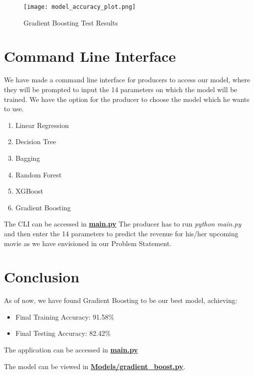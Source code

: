 \documentclass[conference]{IEEEtran}
\begin{document}
    \begin{figure}[h]
        \centering
        \texttt{[image: model\_accuracy\_plot.png]}
        \caption{Gradient Boosting Test Results}
        \label{fig:gradient_boosting_test}
    \end{figure}

\section{Command Line Interface}
    We have made a command line interface for producers to access our model, where they will be prompted to input the 14 parameters on which the model will be trained.
    We have the option for the producer to choose the model which he wants to use.
    \begin{enumerate}
        \item Linear Regression
        \item Decision Tree
        \item Bagging
        \item Random Forest
        \item XGBoost
        \item Gradient Boosting
    \end{enumerate}

    The CLI can be accessed in \href{https://github.com/Vikranth3140/Movie-Revenue-Prediction/blob/main/main.py}{\textbf{main.py}}
    The producer has to run \textit{python main.py} and then enter the 14 parameters to predict the revenue for his/her upcoming movie as we have envisioned in our Problem Statement.

\section{Conclusion}
    As of now, we have found Gradient Boosting to be our best model, achieving:

    \begin{itemize}
        \item Final Training Accuracy: 91.58\%
        \item Final Testing Accuracy: 82.42\%
    \end{itemize}

    The application can be accessed in \href{https://github.com/Vikranth3140/Movie-Revenue-Prediction/blob/main/main.py}{\textbf{main.py}}

    The model can be viewed in \href{https://github.com/Vikranth3140/Movie-Revenue-Prediction/blob/main/models/gradient_boost.py}{\textbf{Models/gradient\_boost.py}}.
\end{document}
